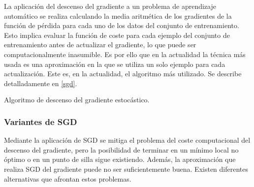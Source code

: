 La aplicación del descenso del gradiente a un problema de aprendizaje automático se realiza calculando la media aritmética de los gradientes de la función de pérdida para cada uno de los datos del conjunto de entrenamiento. Esto implica evaluar la función de coste para cada ejemplo del conjunto de entrenamiento antes de actualizar el gradiente, lo que puede ser computacionalmente inasumible. Es por ello que en la actualidad la técnica más usada es una aproximación en la que se utiliza un solo ejemplo para cada actualización. Este es, en la actualidad, el algoritmo más utilizado. Se describe detalladamente en \ref{sgd}.

\begin{algorithm}
\label{sgd}
 \caption{Algoritmo de descenso del gradiente estocástico.}
     \SetAlgoLined
\end{algorithm}

\subsubsection{Variantes de SGD}

Mediante la aplicación de SGD se mitiga el problema del coste computacional del descenso del gradiente, pero la posibilidad de terminar en un mínimo local no óptimo o en un punto de silla sigue existiendo. Además, la aproximación que realiza SGD del gradiente puede no ser suficientemente buena. Existen diferentes alternativas que afrontan estos problemas.

